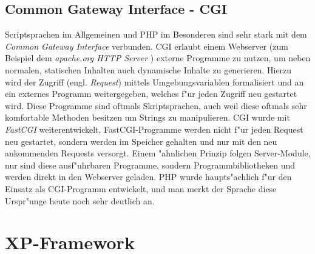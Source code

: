 \subsection{Common Gateway Interface - CGI}
\label{sec:background:cgi}

Scriptsprachen im Allgemeinen und PHP im Besonderen sind sehr stark mit dem \emph{Common Gateway Interface} verbunden.
CGI erlaubt einem Webserver (zum Beispiel dem \emph{apache.org HTTP Server} \cite{APACHEHP}) externe Programme zu nutzen, um
neben normalen, statischen Inhalten auch dynamische Inhalte zu generieren. Hierzu wird der Zugriff (engl. \emph{Request}) mittels
Umgebungsvariablen formalisiert und an ein externes Programm weitergegeben, welches f"ur jeden Zugriff neu gestartet wird.
Diese Programme sind oftmals Skriptsprachen, auch weil diese oftmals sehr komfortable Methoden besitzen um Strings zu manipulieren.
CGI wurde mit \emph{FastCGI} weiterentwickelt, FastCGI-Programme werden nicht f"ur jeden Request neu gestartet, sondern werden
im Speicher gehalten und nur mit den neu ankommenden Requests versorgt. Einem "ahnlichen Prinzip folgen Server-Module, nur sind
diese ausf"uhrbaren Programme, sondern Programmbibliotheken und werden direkt in den Webserver geladen.
PHP wurde haupts"achlich f"ur den Einsatz als CGI-Programm entwickelt, und man merkt der Sprache diese Urspr"unge heute noch sehr
deutlich an.


\section{XP-Framework}
\label{sec:background:xp}

